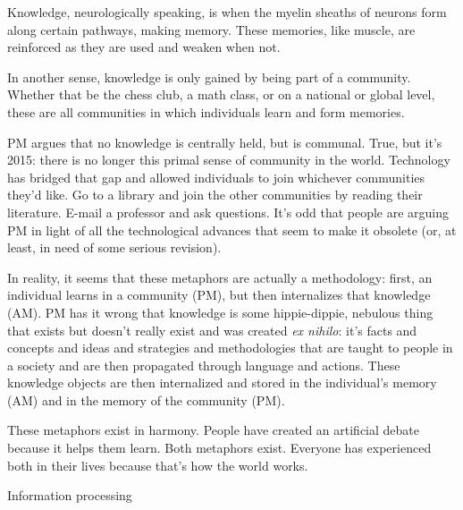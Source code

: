 \documentclass[12pt]{article}
\begin{document}
Knowledge, neurologically speaking, is when the myelin sheaths of neurons form along certain pathways, making memory. These memories, like muscle, are reinforced as they are used and weaken when not.

In another sense, knowledge is only gained by being part of a community. Whether that be the chess club, a math class, or on a national or global level, these are all communities in which individuals learn and form memories.

PM argues that no knowledge is centrally held, but is communal. True, but it's 2015: there is no longer this primal sense of community in the world. Technology has bridged that gap and allowed individuals to join whichever communities they'd like. Go to a library and join the other communities by reading their literature. E-mail a professor and ask questions. It's odd that people are arguing PM in light of all the technological advances that seem to make it obsolete (or, at least, in need of some serious revision).

In reality, it seems that these metaphors are actually a methodology: first, an individual learns in a community (PM), but then internalizes that knowledge (AM). PM has it wrong that knowledge is some hippie-dippie, nebulous thing that exists but doesn't really exist and was created \textit{ex nihilo}: it's facts and concepts and ideas and strategies and methodologies that are taught to people in a society and are then propagated through language and actions. These knowledge objects are then internalized and stored in the individual's memory (AM) and in the memory of the community (PM).

These metaphors exist in harmony. People have created an artificial debate because it helps them learn. Both metaphors exist. Everyone has experienced both in their lives because that's how the world works.

\clearpage
\begin{center}
    {\LARGE Information processing}
\end{center}
\end{document}
